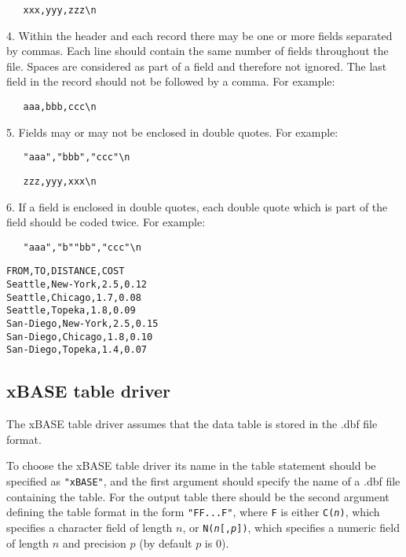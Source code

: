 \documentclass[10pt]{article}
\begin{document}
\verb|   xxx,yyy,zzz\n|

\medskip

4. Within the header and each record there may be one or more fields
separated by commas. Each line should contain the same number of fields
throughout the file. Spaces are considered as part of a field and
therefore not ignored. The last field in the record should not be
followed by a comma. For example:

\medskip

\verb|   aaa,bbb,ccc\n|

\medskip

5. Fields may or may not be enclosed in double quotes. For example:

\medskip

\verb|   "aaa","bbb","ccc"\n|

\verb|   zzz,yyy,xxx\n|

\medskip

6. If a field is enclosed in double quotes, each double quote which is
part of the field should be coded twice. For example:

\medskip

\verb|   "aaa","b""bb","ccc"\n|

\medskip


\begin{verbatim}
FROM,TO,DISTANCE,COST
Seattle,New-York,2.5,0.12
Seattle,Chicago,1.7,0.08
Seattle,Topeka,1.8,0.09
San-Diego,New-York,2.5,0.15
San-Diego,Chicago,1.8,0.10
San-Diego,Topeka,1.4,0.07
\end{verbatim}

\subsection{xBASE table driver}

The xBASE table driver assumes that the data table is stored in the
.dbf file format.

To choose the xBASE table driver its name in the table statement should
be specified as \verb|"xBASE"|, and the first argument should specify
the name of a .dbf file containing the table. For the output table there
should be the second argument defining the table format in the form
\verb|"FF...F"|, where \verb|F| is either {\tt C({\it n})},
which specifies a character field of length $n$, or
{\tt N({\it n}{\rm [},{\it p}{\rm ]})}, which specifies a numeric field
of length $n$ and precision $p$ (by default $p$ is 0).
\end{document}
